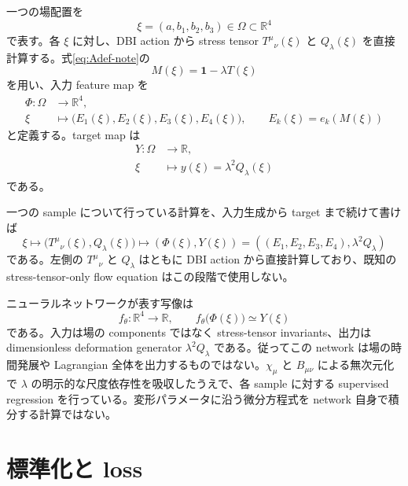 \documentclass[a4paper,11pt]{ltjsreport}
\newcommand{\Id}{\mathbf 1}
\begin{document}
一つの場配置を
\begin{equation}
 \xi=(a,b_1,b_2,b_3)\in\Omega\subset\mathbb R^4
\end{equation}
で表す。各 $\xi$ に対し、DBI action から stress tensor $T^\mu{}_{\nu}(\xi)$ と $Q_\lambda(\xi)$ を直接計算する。式\eqref{eq:Adef-note}の
\begin{equation}
 M(\xi)=\Id-\lambda T(\xi)
\end{equation}
を用い、入力 feature map を
\begin{align}
 \Phi:\Omega&\longrightarrow\mathbb R^4,\nonumber\\
 \xi&\longmapsto
 \bigl(E_1(\xi),E_2(\xi),E_3(\xi),E_4(\xi)\bigr),
 \qquad E_k(\xi)=e_k(M(\xi))
 \label{eq:nn-feature-map}
\end{align}
と定義する。target map は
\begin{align}
 Y:\Omega&\longrightarrow\mathbb R,\nonumber\\
 \xi&\longmapsto y(\xi)=\lambda^2Q_\lambda(\xi)
 \label{eq:nn-target-map}
\end{align}
である。

一つの sample について行っている計算を、入力生成から target まで続けて書けば
\begin{equation}
 \xi
 \longmapsto
 \bigl(T^\mu{}_{\nu}(\xi),Q_\lambda(\xi)\bigr)
 \longmapsto
 \left(\Phi(\xi),Y(\xi)\right)
 =\left((E_1,E_2,E_3,E_4),\lambda^2Q_\lambda\right)
 \label{eq:nn-data-pipeline}
\end{equation}
である。左側の $T^\mu{}_{\nu}$ と $Q_\lambda$ はともに DBI action から直接計算しており、既知の stress-tensor-only flow equation はこの段階で使用しない。

ニューラルネットワークが表す写像は
\begin{equation}
 f_\theta:\mathbb R^4\longrightarrow\mathbb R,
 \qquad
 f_\theta\bigl(\Phi(\xi)\bigr)\simeq Y(\xi)
 \label{eq:nn-explicit-map}
\end{equation}
である。入力は場の components ではなく stress-tensor invariants、出力は dimensionless deformation generator $\lambda^2Q_\lambda$ である。従ってこの network は場の時間発展や Lagrangian 全体を出力するものではない。$\chi_\mu$ と $B_{\mu\nu}$ による無次元化で $\lambda$ の明示的な尺度依存性を吸収したうえで、各 sample に対する supervised regression を行っている。変形パラメータに沿う微分方程式を network 自身で積分する計算ではない。

\section{標準化と loss}
\end{document}
